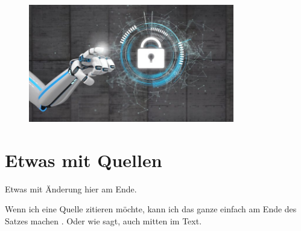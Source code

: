 \documentclass{report}
\begin{document}
\begin{figure}[h]
    \centering
    \includegraphics[width=0.8\textwidth]{datenschutz.jpg}
    \end{figure}



\section{Etwas mit Quellen}

Etwas mit Änderung hier am Ende.

Wenn ich eine Quelle zitieren möchte, kann ich das ganze einfach am Ende des Satzes machen \citep{example}. Oder wie \citet{example} sagt, auch mitten im Text.


\nocite{*}

\printbibliography
\end{document}
